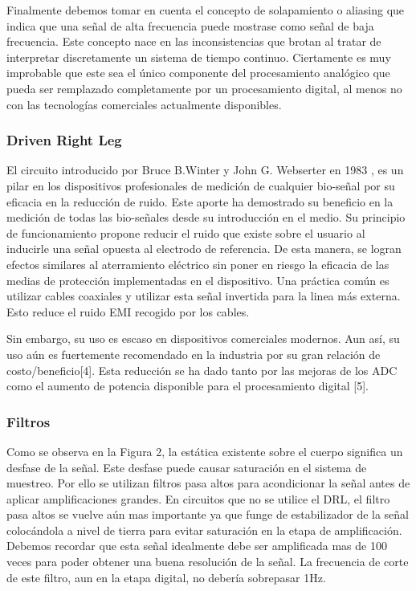 Finalmente debemos tomar en cuenta el concepto de solapamiento o aliasing que indica que una señal de alta frecuencia puede mostrase como señal de baja frecuencia. Este concepto nace en las inconsistencias que brotan al tratar de interpretar discretamente un sistema de tiempo continuo. Ciertamente es muy improbable que este  sea el único componente del procesamiento analógico que pueda ser remplazado completamente por un procesamiento digital, al menos no con las tecnologías comerciales actualmente disponibles.

\subsubsection{Driven Right Leg}
\label{sec:org1b4a218}
El circuito introducido por Bruce B.Winter y John G. Webserter en 1983 \cite{Winter1983}, es un pilar en los dispositivos profesionales de medición de cualquier bio-señal por su eficacia en la reducción de ruido. Este aporte ha demostrado su beneficio en la medición de todas las bio-señales desde su introducción en el medio. Su principio de funcionamiento propone reducir el ruido que existe sobre el usuario al inducirle una señal opuesta al electrodo de referencia. De esta manera, se logran efectos similares al aterramiento eléctrico sin poner en riesgo la eficacia de las medias de protección implementadas en el dispositivo. Una práctica común es utilizar cables coaxiales y utilizar esta señal invertida para la linea más externa. Esto reduce el ruido EMI recogido por los cables.

Sin embargo, su uso es escaso en dispositivos comerciales modernos. Aun así, su uso aún es fuertemente recomendado en la industria por su gran relación de costo/beneficio[4]. Esta reducción se ha dado tanto por las mejoras de los ADC como el aumento de potencia disponible para el procesamiento digital [5].

\subsubsection{Filtros}
\label{sec:org4084e21}
Como se observa en la Figura 2, la estática existente sobre el cuerpo significa un desfase de la señal. Este desfase puede causar saturación en el sistema de muestreo. Por ello se utilizan filtros pasa altos para acondicionar la señal antes de aplicar amplificaciones grandes. En circuitos que no se utilice el DRL, el filtro pasa altos se vuelve aún mas importante ya que funge de estabilizador de la señal colocándola a nivel de tierra para evitar saturación en la etapa de amplificación. Debemos recordar que esta señal idealmente debe ser amplificada mas de 100 veces para poder obtener una buena resolución de la señal. La frecuencia de corte de este filtro, aun en la etapa digital, no debería sobrepasar 1Hz.

